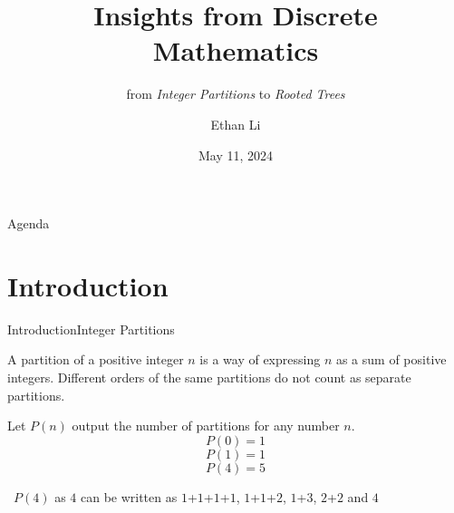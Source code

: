 \documentclass{beamer}
\title{Insights from Discrete Mathematics}
\subtitle{from \emph{Integer Partitions} to \emph{Rooted Trees}}
\author{Ethan Li}
\date{May 11, 2024}
\begin{document}
    \begin{frame}
        \titlepage
    \end{frame}


    \begin{frame}{Agenda}
        \tableofcontents
    \end{frame}


    \section{Introduction}
    \begin{frame}{Introduction}{Integer Partitions}
        \begin{definition}
            A partition of a positive integer $n$ is a way of expressing $n$ as a sum of positive integers. Different orders of the same partitions do not count as separate partitions.
        \end{definition}

        \begin{example}
            Let $P(n)$ output the number of partitions for any number $n$.
            \begin{equation}
                P(0) = 1
            \end{equation}
            \begin{equation}
                P(1) = 1
            \end{equation}
            \begin{equation}
                P(4) = 5
            \end{equation}
            
            \scriptsize\centering\ $P(4)$ as $4$ can be written as $1$+$1$+$1$+$1$, $1$+$1$+$2$, $1$+$3$, $2$+$2$ and $4$
        \end{example}
    \end{frame}
\end{document}
